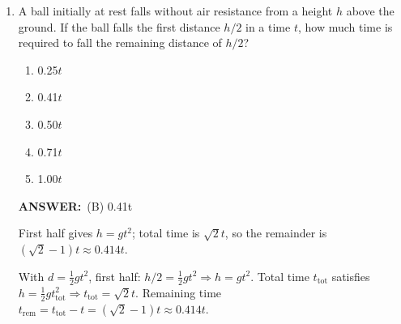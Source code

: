 \documentclass[12pt, a4paper]{article}
\makeatletter
\newcommand{\finalanswer}[1]{\textbf{ANSWER:}~#1}
\newif\if@categoryprinted
\newcommand{\category}[1]{\if@categoryprinted\relax\else\textit{\textcolor{gray}{Category: #1}}\global\@categoryprintedtrue\fi}
\makeatother
\begin{document}
\begin{CJK*}{UTF8}{gbsn}
\begin{enumerate}[itemsep=1.0em, topsep=0.6em]
\category{RC Circuits}
\begin{answerbox}
\finalanswer{(D) 7 volts}
\end{answerbox}
\begin{insightbox}
KVL: $\varepsilon=V_R+V_C$. With $I$ known, find $V_R=IR$ then $V_C$.
\end{insightbox}
\begin{solutionbox}

KVL: $\varepsilon - V_R - V_C = 0$. With $I=0.50\,\text{A}$ and $R=10.0\,\Omega$, $V_R=IR=5.0\,\text{V}$. Hence $V_C=\varepsilon - V_R = 12-5=7\,\text{V}$.
\end{solutionbox}

\newpage

\item \label{prob:13}
A ball initially at rest falls without air resistance from a height $h$ above the ground. If the ball falls the first distance $h/2$ in a time $t$, how much time is required to fall the remaining distance of $h/2$?
\begin{enumerate}[label=(\Alph*)]
    \item 0.25$t$
    \item 0.41$t$
    \item 0.50$t$
    \item 0.71$t$
    \item 1.00$t$
\end{enumerate}

\category{Kinematics}
\begin{answerbox}
\finalanswer{(B) 0.41t}
\end{answerbox}
\begin{insightbox}
First half gives $h=gt^2$; total time is $\sqrt2 t$, so the remainder is $(\sqrt2-1)t\approx0.414t$.
\end{insightbox}
\begin{solutionbox}

With $d=\tfrac{1}{2}gt^2$, first half: $h/2=\tfrac{1}{2}gt^2\Rightarrow h=gt^2$. Total time $t_{\text{tot}}$ satisfies $h=\tfrac{1}{2}g t_{\text{tot}}^2\Rightarrow t_{\text{tot}}=\sqrt{2}t$. Remaining time $t_{\text{rem}}=t_{\text{tot}}-t=(\sqrt{2}-1)t\approx 0.414t$.
\end{solutionbox}


\end{enumerate}
\end{CJK*}
\end{document}
